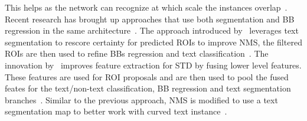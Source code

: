 This helps as the network can recognize at which scale the instances overlap~\citep{wang_shape_2019}.
Recent research has brought up approaches that use both segmentation and \ac{BB} regression in the
same architecture~\citep{xie_scene_2018,dai_fused_2018}.
The approach introduced by~\cite{xie_scene_2018} leverages text segmentation to rescore certainty
for predicted \acp{ROI} to improve \ac{NMS}, the filtered \acp{ROI} are then used to refine
\acp{BB} regression and text classification~\citep{xie_scene_2018}.
The innovation by~\cite{dai_fused_2018} improves feature extraction for \ac{STD} by fusing lower
level features.
These features are used for \ac{ROI} proposals and are then used to pool the fused feates for
the text/non-text classification, \ac{BB} regression and text segmentation
branches~\citep{dai_fused_2018}.
Similar to the previous approach, \ac{NMS} is modified to use a text segmentation map to better
work with curved text instance~\citep{dai_fused_2018,xie_scene_2018}.

